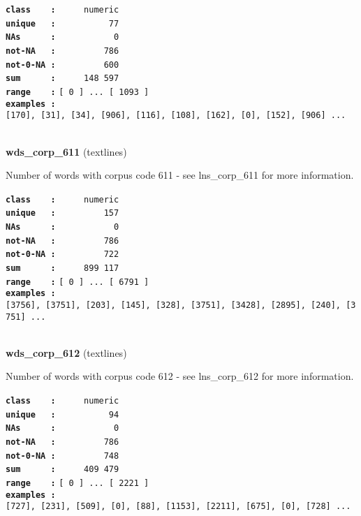 \documentclass[]{article}
\begin{document}
\textbf{\texttt{class\ \ \ \ :}} \texttt{~~~~~numeric}\\
\textbf{\texttt{unique\ \ \ :}} \texttt{~~~~~~~~~~77}\\
\textbf{\texttt{NAs\ \ \ \ \ \ :}} \texttt{~~~~~~~~~~~0}\\
\textbf{\texttt{not-NA\ \ \ :}} \texttt{~~~~~~~~~786}\\
\textbf{\texttt{not-0-NA\ :}} \texttt{~~~~~~~~~600}\\
\textbf{\texttt{sum\ \ \ \ \ \ :}} \texttt{~~~~~148~597}\\
\textbf{\texttt{range\ \ \ \ :}}
\texttt{{[}\ 0\ {]}\ ...\ {[}\ 1093\ {]}}\\
\textbf{\texttt{examples\ :}}
\texttt{{[}170{]},\ {[}31{]},\ {[}34{]},\ {[}906{]},\ {[}116{]},\ {[}108{]},\ {[}162{]},\ {[}0{]},\ {[}152{]},\ {[}906{]}\ ...}\\

~

\textbf{wds\_corp\_611} (textlines)

Number of words with corpus code 611 - see lns\_corp\_611 for more
information.

\textbf{\texttt{class\ \ \ \ :}} \texttt{~~~~~numeric}\\
\textbf{\texttt{unique\ \ \ :}} \texttt{~~~~~~~~~157}\\
\textbf{\texttt{NAs\ \ \ \ \ \ :}} \texttt{~~~~~~~~~~~0}\\
\textbf{\texttt{not-NA\ \ \ :}} \texttt{~~~~~~~~~786}\\
\textbf{\texttt{not-0-NA\ :}} \texttt{~~~~~~~~~722}\\
\textbf{\texttt{sum\ \ \ \ \ \ :}} \texttt{~~~~~899~117}\\
\textbf{\texttt{range\ \ \ \ :}}
\texttt{{[}\ 0\ {]}\ ...\ {[}\ 6791\ {]}}\\
\textbf{\texttt{examples\ :}}
\texttt{{[}3756{]},\ {[}3751{]},\ {[}203{]},\ {[}145{]},\ {[}328{]},\ {[}3751{]},\ {[}3428{]},\ {[}2895{]},\ {[}240{]},\ {[}3751{]}\ ...}\\

~

\textbf{wds\_corp\_612} (textlines)

Number of words with corpus code 612 - see lns\_corp\_612 for more
information.

\textbf{\texttt{class\ \ \ \ :}} \texttt{~~~~~numeric}\\
\textbf{\texttt{unique\ \ \ :}} \texttt{~~~~~~~~~~94}\\
\textbf{\texttt{NAs\ \ \ \ \ \ :}} \texttt{~~~~~~~~~~~0}\\
\textbf{\texttt{not-NA\ \ \ :}} \texttt{~~~~~~~~~786}\\
\textbf{\texttt{not-0-NA\ :}} \texttt{~~~~~~~~~748}\\
\textbf{\texttt{sum\ \ \ \ \ \ :}} \texttt{~~~~~409~479}\\
\textbf{\texttt{range\ \ \ \ :}}
\texttt{{[}\ 0\ {]}\ ...\ {[}\ 2221\ {]}}\\
\textbf{\texttt{examples\ :}}
\texttt{{[}727{]},\ {[}231{]},\ {[}509{]},\ {[}0{]},\ {[}88{]},\ {[}1153{]},\ {[}2211{]},\ {[}675{]},\ {[}0{]},\ {[}728{]}\ ...}\\
\end{document}
